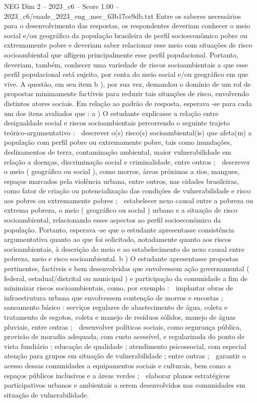 \begin{textsample}{NEG Dim 2 – 2023\_c6 – Score 1.00 – 2023\_c6/enade\_2023\_eng\_mec\_63b17ce9db.txt}
Entre os saberes necessários para o desenvolvimento das respostas, os respondentes deveriam conhecer o meio social e/ou geográfico da população brasileira de perfil socioeconômico pobre ou extremamente pobre e deveriam saber relacionar esse meio com situações de risco socioambiental que afligem principalmente esse perfil populacional.
Portanto, deveriam, também, conhecer uma variedade de riscos socioambientais a que esse perfil populacional está sujeito, por conta do meio social e/ou geográfico em que vive.
A questão, em seu item b ), por sua vez, demandou o domínio de um rol de propostas minimamente factíveis para reduzir tais situações de risco, envolvendo distintos atores sociais.
Em relação ao padrão de resposta, esperava -se para cada um dos itens avaliados que : a ) O estudante explicasse a relação entre desigualdade social e riscos socioambientais percorrendo o seguinte trajeto teórico-argumentativo :  descrever o(s) risco(s) socioambiental(is) que afeta(m) a população com perfil pobre ou extremamente pobre, tais como inundações, deslizamentos de terra, contaminação ambiental, maior vulnerabilidade em relação a doenças, discriminação social e criminalidade, entre outros ;  descrever o meio ( geográfico ou social ), como morros, áreas próximas a rios, mangues, espaços marcados pela violência urbana, entre outros, nas cidades brasileiras, como fator de criação ou potencialização das condições de vulnerabilidade e risco aos pobres ou extremamente pobres ;  estabelecer nexo causal entre a pobreza ou extrema pobreza, o meio ( geográfico ou social ) urbano e a situação de risco socioambiental, relacionando esses aspectos ao perfil socioeconômico da população.
Portanto, esperava -se que o estudante apresentasse consistência argumentativa quanto ao que foi solicitado, notadamente quanto aos riscos socioambientais, à descrição do meio e ao estabelecimento do nexo causal entre pobreza, meio e risco socioambiental. b ) O estudante apresentasse propostas pertinentes, factíveis e bem desenvolvidas que envolvessem ação governamental ( federal, estadual/distrital ou municipal ) e participação da comunidade a fim de minimizar riscos socioambientais, como, por exemplo :  implantar obras de infraestrutura urbana que envolvessem contenção de morros e encostas ; saneamento básico : serviços regulares de abastecimento de água, coleta e tratamento de esgotos, coleta e manejo de resíduos sólidos, manejo de águas pluviais, entre outras ;  desenvolver políticas sociais, como segurança pública, provisão de moradia adequada, com custo acessível, e regularizada do ponto de vista fundiário ; educação de qualidade ; atendimento psicossocial, com especial atenção para grupos em situação de vulnerabilidade ; entre outras ;  garantir o acesso dessas comunidades a equipamentos sociais e culturais, bem como a espaços públicos inclusivos e a áreas verdes ;  elaborar planos estratégicos participativos urbanos e ambientais a serem desenvolvidos nas comunidades em situação de vulnerabilidade.

\end{textsample}
